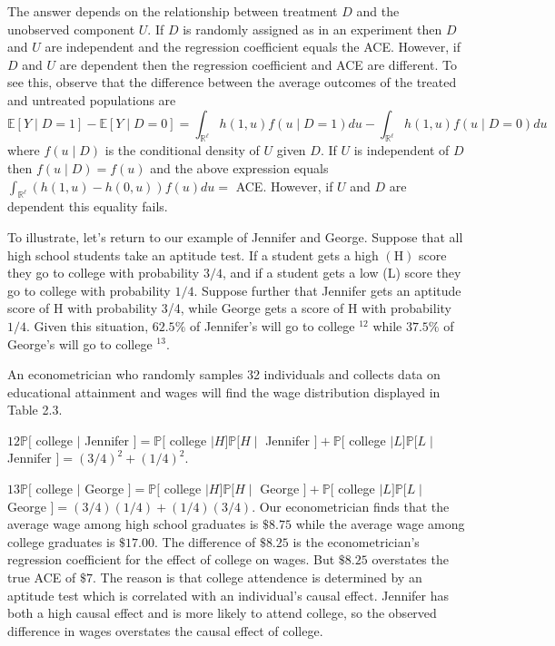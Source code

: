 \documentclass[10pt]{article}
\begin{document}
The answer depends on the relationship between treatment $D$ and the unobserved component $U$. If $D$ is randomly assigned as in an experiment then $D$ and $U$ are independent and the regression coefficient equals the ACE. However, if $D$ and $U$ are dependent then the regression coefficient and ACE are different. To see this, observe that the difference between the average outcomes of the treated and untreated populations are
$$
\mathbb{E}[Y \mid D=1]-\mathbb{E}[Y \mid D=0]=\int_{\mathbb{R}^{\ell}} h(1, u) f(u \mid D=1) d u-\int_{\mathbb{R}^{\ell}} h(1, u) f(u \mid D=0) d u
$$
where $f(u \mid D)$ is the conditional density of $U$ given $D$. If $U$ is independent of $D$ then $f(u \mid D)=f(u)$ and the above expression equals $\int_{\mathbb{R}^{\ell}}(h(1, u)-h(0, u)) f(u) d u=$ ACE. However, if $U$ and $D$ are dependent this equality fails.

To illustrate, let's return to our example of Jennifer and George. Suppose that all high school students take an aptitude test. If a student gets a high $(\mathrm{H})$ score they go to college with probability $3 / 4$, and if a student gets a low (L) score they go to college with probability $1 / 4$. Suppose further that Jennifer gets an aptitude score of $\mathrm{H}$ with probability 3/4, while George gets a score of $\mathrm{H}$ with probability $1 / 4$. Given this situation, $62.5 \%$ of Jennifer's will go to college ${ }^{12}$ while $37.5 \%$ of George's will go to college ${ }^{13}$.

An econometrician who randomly samples 32 individuals and collects data on educational attainment and wages will find the wage distribution displayed in Table 2.3.

$12 \mathbb{P}[$ college $\mid$ Jennifer $]=\mathbb{P}[$ college $\mid H] \mathbb{P}[H \mid$ Jennifer $]+\mathbb{P}[$ college $\mid L] \mathbb{P}[L \mid$ Jennifer $]=(3 / 4)^{2}+(1 / 4)^{2} .$

$13 \mathbb{P}[$ college $\mid$ George $]=\mathbb{P}[$ college $\mid H] \mathbb{P}[H \mid$ George $]+\mathbb{P}[$ college $\mid L] \mathbb{P}[L \mid$ George $]=(3 / 4)(1 / 4)+(1 / 4)(3 / 4)$. Our econometrician finds that the average wage among high school graduates is $\$ 8.75$ while the average wage among college graduates is $\$ 17.00$. The difference of $\$ 8.25$ is the econometrician's regression coefficient for the effect of college on wages. But $\$ 8.25$ overstates the true ACE of $\$ 7$. The reason is that college attendence is determined by an aptitude test which is correlated with an individual's causal effect. Jennifer has both a high causal effect and is more likely to attend college, so the observed difference in wages overstates the causal effect of college.
\end{document}
